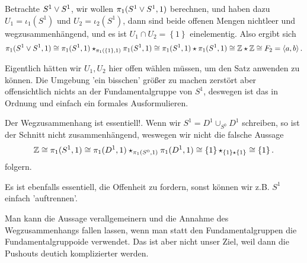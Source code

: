 \begin{example}\label{ex:fundamentalgruppe-von-s1-wedge-s1}
    Betrachte $S^1 \vee S^1$, wir wollen $\pi_1(S^1 \vee S^1, 1)$ berechnen, und haben dazu $U_1 = ι_1(S^1)$ und $U_2 = ι_2(S^1)$, dann sind beide offenen Mengen nichtleer und wegzusammenhängend, und es ist $U_1 \cap U_2 = \left \{1\right\} $ einelementig. Also ergibt sich
    \[
        \pi_1(S^1 \vee S^1,1) \cong \pi_1(S^1,1) \star_{\pi_1(\left \{1\right\} ,1)} \pi_1(S^1,1) \cong \pi_1(S^1,1) \star \pi_1(S^1,1) \cong \mathbb{Z} \star \mathbb{Z} \cong F_2 = \left< a,b \right> 
    .\] 
    \begin{oral}
        Eigentlich hätten wir $U_1,U_2$ hier offen wählen müssen, um den Satz anwenden zu können. Die Umgebung 'ein bisschen' größer zu machen zerstört aber offensichtlich nichts an der Fundamentalgruppe von $S^1$, deswegen ist das in Ordnung und einfach ein formales Ausformulieren.
    \end{oral}
\end{example}

\begin{example}
    Der Wegzusammenhang ist essentiell!. Wenn wir $S^1 = D^1 \cup_{S^0} D^1$ schreiben, so ist der Schnitt nicht zusammenhängend, weswegen wir nicht die falsche Aussage
    \[
        \mathbb{Z} \cong \pi_1(S^1,1) \cong \pi_1(D^1,1) \star_{\pi_1(S^0,1)} \pi_1(D^1,1) \cong \left \{1\right\}  \star_{\left \{1\right\} \star \left \{1\right\} } \cong \left \{1\right\} 
    .\] 
    folgern.

    Es ist ebenfalls essentiell, die Offenheit zu fordern, sonst können wir z.B. $S^1$ einfach 'auftrennen'.
\end{example}


\begin{oral}
    Man kann die Aussage verallgemeinern und die Annahme des Wegzusammenhangs fallen lassen, wenn man statt den Fundamentalgruppen die Fundamentalgruppoide verwendet. Das ist aber nicht unser Ziel, weil dann die Pushouts deutich komplizierter werden.
\end{oral}

